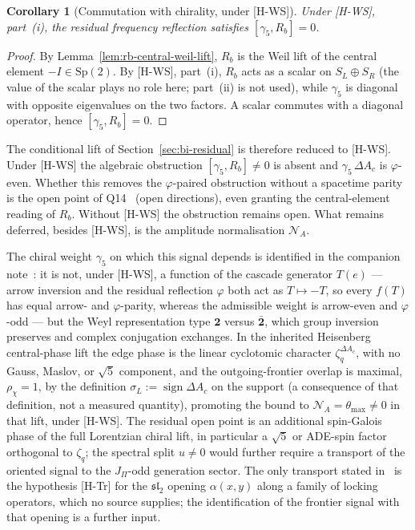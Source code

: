 \documentclass[11pt]{article}
\newtheorem{corollary}{Corollary}
\begin{document}
    \begin{corollary}[Commutation with chirality, under {[H-WS]}]
      \label{cor:gamma5-rb-commutes}
      Under [H-WS], part~(i), the residual frequency reflection satisfies $[\gamma_5,R_b]=0$.
    \end{corollary}

    \begin{proof}
      By Lemma~\ref{lem:rb-central-weil-lift}, $R_b$ is the Weil lift of the central element
      $-I\in\mathrm{Sp}(2)$.
      By [H-WS], part~(i), $R_b$ acts as a scalar on $S_L\oplus S_R$ (the value of the scalar plays no role here;
      part~(ii) is not used), while $\gamma_5$ is diagonal with opposite eigenvalues on the two factors.
      A scalar commutes with a diagonal operator, hence $[\gamma_5,R_b]=0$.
    \end{proof}

    The conditional lift of Section~\ref{sec:bi-residual} is therefore reduced to [H-WS].
    Under [H-WS] the algebraic obstruction $[\gamma_5,R_b]\neq0$ is absent and $\gamma_5\,\Delta A_c$ is
    $\varphi$-even.
    Whether this removes the $\varphi$-paired obstruction without a spacetime parity is the open point of
    Q14~\cite{Beau2026q14} (open directions), even granting the central-element reading of $R_b$.
    Without [H-WS] the obstruction remains open.
    What remains deferred, besides [H-WS], is the amplitude normalisation $\mathcal{N}_A$.

    The chiral weight $\gamma_5$ on which this signal depends is identified in the companion
    note~\cite{Beau2026cho}: it is not, under [H-WS], a function of the cascade generator $T(e)$ --- arrow inversion and the
    residual reflection $\varphi$ both act as $T\mapsto -T$, so every $f(T)$ has equal arrow- and
    $\varphi$-parity, whereas the admissible weight is arrow-even and $\varphi$-odd --- but the Weyl
    representation type $\mathbf{2}$ versus $\bar{\mathbf{2}}$, which group inversion preserves and complex
    conjugation exchanges.
    In the inherited Heisenberg central-phase lift the edge phase is the linear cyclotomic character
    $\zeta_q^{\Delta A_c}$, with no Gauss, Maslov, or $\sqrt{5}$ component, and the outgoing-frontier overlap is
    maximal, $\rho_\chi = 1$, by the definition $\sigma_L:=\operatorname{sign}\Delta A_c$ on the support (a consequence of
    that definition, not a measured quantity), promoting the bound to $\mathcal{N}_A = \theta_{\max} \neq 0$ in that
    lift, under [H-WS].
    The residual open point is an additional spin-Galois phase of the full Lorentzian chiral lift, in particular
    a $\sqrt{5}$ or ADE-spin factor orthogonal to $\zeta_q$; the spectral split $u\neq 0$ would further require a transport of the oriented signal to the
    $J_\Pi$-odd generation sector.
    The only transport stated in~\cite{Beau2026prs} is the hypothesis [H-Tr] for the $\mathfrak{sl}_2$ opening
    $\alpha(x,y)$ along a family of locking operators, which no source supplies; the identification of the
    frontier signal with that opening is a further input.

    
    
\end{document}
